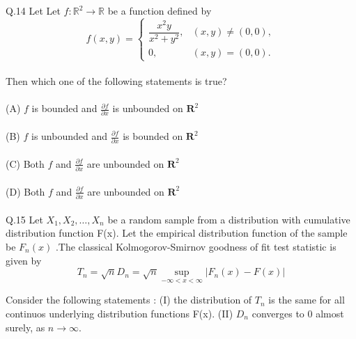 \documentclass{book}[200pt]
\begin{document}
{Q.14 Let Let $f : \mathbb{R}^2 \to \mathbb{R}$ be a function defined by
\[
f(x,y) =
\begin{cases}
	\dfrac{x^2y}{x^2 + y^2}, & (x,y) \neq (0,0), \\[6pt]
	0, & (x,y) = (0,0).
\end{cases}
\]
\\
Then which one of the following statements is true?\\
\\
(A) $f$ is  bounded and $ \frac{\partial f}{\partial x}$ is unbounded on $\mathbf{R}^2$\\
\\
(B) $f$ is  unbounded and $ \frac{\partial f}{\partial x}$ is bounded on $\mathbf{R}^2$ \\
\\
(C) Both $f$ and $ \frac{\partial f}{\partial x}$ are unbounded on $\mathbf{R}^2$\\
\\
(D) Both $f$ and $ \frac{\partial f}{\partial x}$ are unbounded on $\mathbf{R}^2$\\
\\
Q.15 Let $X_1 ,X_2, \dots ,X_n$ be a random sample from a distribution with cumulative distribution function F(x). Let the empirical distribution function of the sample be $F_n(x)$ .The classical Kolmogorov-Smirnov goodness of fit test statistic is given by \\
$$ T_n = \sqrt{n}D_n = \sqrt{n} \sup_{-\infty < x < \infty}  | F_n(x) - F(x) |  $$

Consider the following statements :
(I) the distribution of $T_n$ is the same for all continuos underlying distribution functions F(x).
(II) $D_n$ converges to 0 almost surely, as $n \to \infty $.

}
\end{document}
